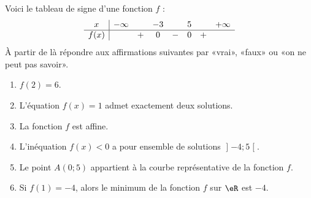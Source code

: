 
\begin{exercice}\label{exosmath-0563}

    Voici le tableau de signe d'une fonction \( f\) :
    \begin{equation*}
        \begin{array}[]{c|ccccccc}
            x&-\infty&&-3&&5&&+\infty\\
            \hline
            f(x)&&+&0&-&0&+&\\
        \end{array}
    \end{equation*}
    À partir de là répondre aux affirmations suivantes par «vrai», «faux» ou «on ne peut pas savoir».
    \begin{enumerate}
        \item
            \( f(2)=6\).
        \item
            L'équation \( f(x)=1\) admet exactement deux solutions.
        \item
            La fonction \( f\) est affine.
        \item
            L'inéquation \( f(x)<0\) a pour ensemble de solutions \( \mathopen] -4 ;5 \mathclose[\).
        \item
            Le point \( A(0;5)\) appartient à la courbe représentative de la fonction \( f\).
        \item
            Si \( f(1)=-4\), alors le minimum de la fonction \( f\) sur \( \eR\) est \( -4\).
    \end{enumerate}
\end{exercice}
